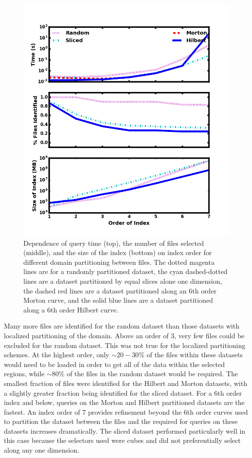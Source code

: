 \documentclass[apjl]{emulateapj}
\begin{document}
\begin{figure}[hbpt]
\begin{center}
\includegraphics[width=\columnwidth,keepaspectratio]{../images/vary_decomp_to0.png}
\caption{Dependence of query time (top), the number of files selected (middle), and the size of the index (bottom) on index order for different domain partitioning between files. The dotted magenta lines are for a randomly partitioned dataset, the cyan dashed-dotted lines are a dataset partitioned by equal slices alone one dimension, the dashed red lines are a dataset partitioned along an 6th order Morton curve, and the solid blue lines are a dataset partitioned along a 6th order Hilbert curve.}
\label{fig:test_decomp}
\end{center}
\end{figure}

Many more files are identified for the random dataset than those datasets with localized partitioning of the domain. Above an order of 3, very few files could be excluded for the random dataset. This was not true for the localized partitioning schemes. At the highest order, only $\sim20-30$\% of the files within these datasets would need to be loaded in order to get all of the data within the selected regions, while $\sim80$\% of the files in the random dataset would be required. The smallest fraction of files were identified for the Hilbert and Morton datasets, with a slightly greater fraction being identified for the sliced dataset. For a 6th order index and below, queries on the Morton and Hilbert partitioned datasets are the fastest. An index order of 7 provides refinement beyond the 6th order curves used to partition the dataset between the files and the required for queries on these datasets increases dramatically. The sliced dataset performed particularly well in this case because the selectors used were cubes and did not preferentially select along any one dimension. 
\end{document}
